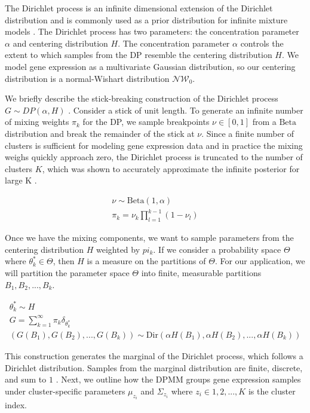\documentclass[10pt,letterpaper]{article}
\begin{document}
The Dirichlet process is an infinite dimensional extension of the Dirichlet distribution \cite{fergusonBayesianAnalysisNonparametric1973} and is commonly used as a prior distribution for infinite mixture models \cite{muller2004nonparametric, gorurDirichletProcessGaussian2010}. The Dirichlet process has two parameters: the concentration parameter $\alpha$ and centering distribution $H$. The concentration parameter $\alpha$ controls the extent to which samples from the DP resemble the centering distribution $H$. We model gene expression as a multivariate Gaussian distribution, so our centering distribution is a normal-Wishart distribution $\mathcal{NW}_0$.

We briefly describe the stick-breaking construction of the Dirichlet process $G \sim DP(\alpha, H)$ \cite{hughes2013memoized, teh2010dirichlet, gelmanBayesianDataAnalysis2013, fergusonBayesianAnalysisNonparametric1973}. Consider a stick of unit length. To generate an infinite number of mixing weights $\pi_k$ for the DP, we sample breakpoints $\nu \in [0, 1]$ from a $\text{Beta}$ distribution and break the remainder of the stick at $\nu$. Since a finite number of clusters is sufficient for modeling gene expression data and in practice the mixing weighs quickly approach zero, the Dirichlet process is truncated to the number of clusters $K$, which was shown to accurately approximate the infinite posterior for large K \cite{hughes2013memoized}.

\begin{gather}
\label{eq:dp}
\nu \sim \text{Beta}(1, \alpha) \\
\pi_k = \nu_k \prod_{l=1}^{k-1}(1 - \nu_l)
\end{gather}

Once we have the mixing components, we want to sample parameters from the centering distribution $H$ weighted by $pi_k$. If we consider a probability space $\Theta$ where $\theta_k^{*} \in \Theta$, then $H$ is a measure on the partitions of $\Theta$. For our application, we will partition the parameter space $\Theta$ into finite, measurable partitions $B_1, B_2, ..., B_k$. 

\begin{gather}
\theta_k^{*} \sim H \\
G = \sum_{k=1}^{\infty} \pi_k \delta_{\theta_k^{*}} \\
(G(B_1), G(B_2), ..., G(B_k)) \sim \text{Dir}(\alpha H(B_1), \alpha H(B_2), ..., \alpha H(B_k)) 
\end{gather}

This construction generates the marginal of the Dirichlet process, which follows a Dirichlet distribution. Samples from the marginal distribution are finite, discrete, and sum to $1$ \cite{fergusonBayesianAnalysisNonparametric1973}. Next, we outline how the DPMM groups gene expression samples under cluster-specific parameters $\mu_{z_i}$ and $\Sigma_{z_i}$ where $z_i \in {1, 2, ..., K}$ is the cluster index.
\end{document}
